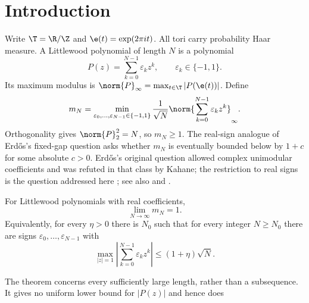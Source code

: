 \section{Introduction}\label{sec:introduction}
Write $\T=\R/\Z$ and $\e(t)=\exp(2\pi i t)$. All tori carry probability
Haar measure. A Littlewood polynomial of length $N$ is a polynomial
\[
 P(z)=\sum_{k=0}^{N-1}\varepsilon_k z^k,
 \qquad \varepsilon_k\in\{-1,1\}.
\]
Its maximum modulus is $\norm{P}_\infty=\max_{t\in\T}|P(\e(t))|$.
Define
\[
 m_N=\min_{\varepsilon_0,\ldots,\varepsilon_{N-1}\in\{-1,1\}}
       \frac{1}{\sqrt N}\norm{\sum_{k=0}^{N-1}\varepsilon_k z^k}_\infty.
\]
Orthogonality gives $\norm{P}_2^2=N$, so $m_N\ge1$. The real-sign
analogue of Erd\H{o}s's fixed-gap question asks whether $m_N$ is
eventually bounded below by $1+c$ for some absolute $c>0$.
Erd\H{o}s's original question allowed complex unimodular coefficients
and was refuted in that class by Kahane; the restriction to real signs
is the question addressed here \cite[Problem~22]{Erdos1957}; see also
\cite{Kahane1980} and \cite[Problems~4.13 and~4.31]{HaymanLingham2018}.

\begin{theorem}\label{thm:main}
For Littlewood polynomials with real coefficients,
\[
 \lim_{N\to\infty}m_N=1.
\]
Equivalently, for every $\eta>0$ there is $N_0$ such that for every integer
$N\ge N_0$ there are signs $\varepsilon_0,\ldots,\varepsilon_{N-1}$ with
\[
 \max_{|z|=1}\left|\sum_{k=0}^{N-1}\varepsilon_kz^k\right|
 \le(1+\eta)\sqrt N.
\]
\end{theorem}

The theorem concerns every sufficiently large length, rather than a
subsequence. It gives no uniform lower bound for $|P(z)|$ and hence does
